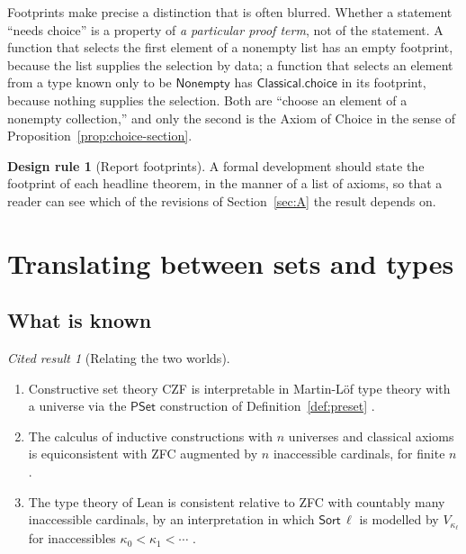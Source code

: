 \documentclass[11pt]{article}
\newcommand{\Sort}{\mathsf{Sort}}
\theoremstyle{definition}
\newtheorem{designrule}[definition]{Design rule}
\theoremstyle{plain}
\theoremstyle{remark}
\newtheorem{cited}[definition]{Cited result}
\begin{document}
Footprints make precise a distinction that is often blurred. Whether a statement ``needs choice'' is a property of \emph{a particular proof term}, not of the statement. A function that selects the first element of a nonempty list has an empty footprint, because the list supplies the selection by data; a function that selects an element from a type known only to be $\mathsf{Nonempty}$ has $\mathsf{Classical.choice}$ in its footprint, because nothing supplies the selection. Both are ``choose an element of a nonempty collection,'' and only the second is the Axiom of Choice in the sense of Proposition~\ref{prop:choice-section}.

\begin{designrule}[Report footprints]\label{dr:footprint}
A formal development should state the footprint of each headline theorem, in the manner of a list of axioms, so that a reader can see which of the revisions of Section~\ref{sec:A} the result depends on.
\end{designrule}

\section{Translating between sets and types}\label{sec:translate}

\subsection{What is known}

\begin{cited}[Relating the two worlds]\label{cit:translate}
\begin{enumerate}[label=(\alph*)]
\item Constructive set theory CZF is interpretable in Martin-L\"of type theory with a universe via the $\mathsf{PSet}$ construction of Definition~\ref{def:preset} \cite{Aczel78,Aczel99}.
\item The calculus of inductive constructions with $n$ universes and classical axioms is equiconsistent with ZFC augmented by $n$ inaccessible cardinals, for finite $n$ \cite{Werner97}.
\item The type theory of Lean is consistent relative to ZFC with countably many inaccessible cardinals, by an interpretation in which $\Sort\,\ell$ is modelled by $V_{\kappa_\ell}$ for inaccessibles $\kappa_0<\kappa_1<\cdots$ \cite{Carneiro19}.
\end{enumerate}
\end{cited}
\end{document}

